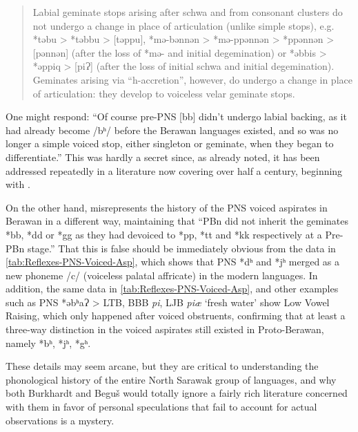 \documentclass[output=paper]{langscibook}
\begin{document}
\begin{quote}
Labial geminate stops arising after schwa and from consonant clusters do not undergo a change in place of articulation (unlike simple stops), e.g. *təbu > *təbbu > [təppu], *mə-bənnən > *mə-ppənnən > *ppənnən > [pənnən] (after the loss of *mə- and initial degemination) or *əbbis > *əppiq > [piɁ] (after the loss of initial schwa and initial degemination). Geminates arising via “h-accretion”, however, do undergo a change in place of articulation: they develop to voiceless velar geminate stops.
\end{quote}

One might respond: “Of course pre-PNS [bb] didn’t undergo labial backing, as it had already become /bʰ/ before the Berawan languages existed, and so was no longer a simple voiced stop, either singleton or geminate, when they began to differentiate.” This was hardly a secret since, as already noted, it has been addressed repeatedly in a literature now covering over half a century, beginning with \citet{Blust1969}.

\largerpage
On the other hand, \citet[188]{Burkhardt2014} misrepresents the history of the PNS voiced aspirates in Berawan in a different way, maintaining that “PBn did not inherit the geminates *bb, *dd or *gg as they had devoiced to *pp, *tt and *kk respectively at a Pre-PBn stage.” That this is false should be immediately obvious from the data in \cref{tab:Reflexes-PNS-Voiced-Asp}, which shows that PNS *dʰ and *jʰ merged as a new phoneme /c/ (voiceless palatal affricate) in the modern languages. In addition, the same data in \cref{tab:Reflexes-PNS-Voiced-Asp}, and other examples such as PNS *əbʰaɁ > LTB, BBB \textit{pi}, LJB \textit{piæ} ‘fresh water’ show Low Vowel Raising, which only happened after voiced obstruents, confirming that at least a three-way distinction in the voiced aspirates still existed in Proto-Berawan, namely *bʰ, *jʰ, *gʰ.

These details may seem arcane, but they are critical to understanding the phonological history of the entire North Sarawak group of languages, and why both Burkhardt and Beguš would totally ignore a fairly rich literature concerned with them in favor of personal speculations that fail to account for actual observations is a mystery.
\end{document}
